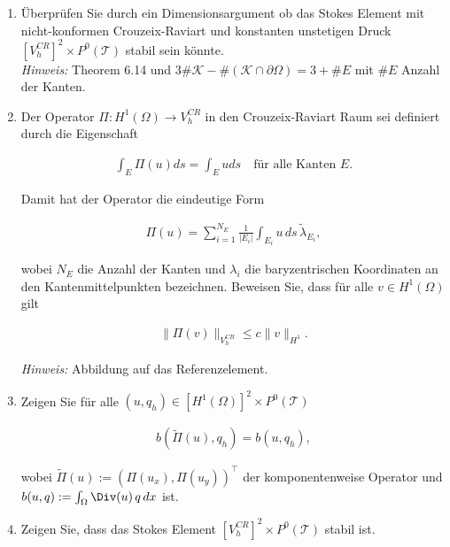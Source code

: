
\begin{exercise}

\phantom{}

\begin{enumerate}[label = \textbf{\alph*)}]
  \item Überprüfen Sie durch ein Dimensionsargument ob das Stokes Element mit
  nicht-konformen Crouzeix-Raviart und konstanten unstetigen Druck
  $[V_h^{CR}]^2 \times P^0(\mathcal{T})$ stabil sein könnte. \\
  \textit{Hinweis:} Theorem 6.14 und
  $3\#\mathcal{K} - \#(\mathcal{K}\cap \partial\Omega) = 3 + \# E$ mit $\# E$
  Anzahl der Kanten.
  \item Der Operator $\Pi: H^1(\Omega) \to V_h^{CR}$ in den Crouzeix-Raviart Raum
  sei definiert durch die Eigenschaft

  \begin{align}
    \int_E \Pi(u) ds = \int_E u ds \quad \text{für alle Kanten } E.
  \end{align}

  Damit hat der Operator die eindeutige Form

  \begin{align}
    \Pi(u) = \sum_{i=1}^{N_E} \frac{1}{|E_i|}\int_{E_i} u\, ds\, \tilde{\lambda}_{E_i},
  \end{align}

  wobei $N_E$ die Anzahl der Kanten und $\lambda_i$ die baryzentrischen Koordinaten
  an den Kantenmittelpunkten bezeichnen. Beweisen Sie, dass für alle $v \in H^1(\Omega)$ gilt

  \begin{align}
    \|\Pi(v)\|_{V_h^{CR}} \leq c\|v\|_{H^1}.
  \end{align}

    \textit{Hinweis:} Abbildung auf das Referenzelement.

    \item Zeigen Sie für alle $(u,q_h) \in [H^1(\Omega)]^2 \times P^0(\mathcal{T})$

    \begin{align}
      b(\tilde{\Pi}(u),q_h) = b(u,q_h),
    \end{align}

    wobei $\tilde{\Pi}(u) := (\Pi(u_x),\Pi(u_y))^\top$ der komponentenweise
    Operator und $b(u,q) := \int_\Omega \Div(u)\, q\, dx$ ist.

    \item Zeigen Sie, dass das Stokes Element $[V_h^{CR}]^2 \times P^0(\mathcal{T})$ stabil ist.

\end{enumerate}

\end{exercise}

